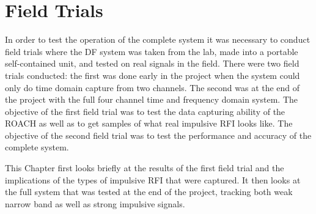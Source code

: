 \chapter{Field Trials}
\label{ch:field-trials}
\graphicspath{{./img/field-trials/}}

In order to test the operation of the complete system it was necessary to conduct field trials where the DF system was taken from the lab, made into a portable self-contained unit, and tested on real signals in the field. There were two field trials conducted: the first was done early in the project when the system could only do time domain capture from two channels. The second was at the end of the project with the full four channel time and frequency domain system. The objective of the first field trial was to test the data capturing ability of the ROACH as well as to get samples of what real impulsive RFI looks like. The objective of the second field trial was to test the performance and accuracy of the complete system.

This Chapter first looks briefly at the results of the first field trial and the implications of the types of impulsive RFI that were captured. It then looks at the full system that was tested at the end of the project, tracking both weak narrow band as well as strong impulsive signals. 




